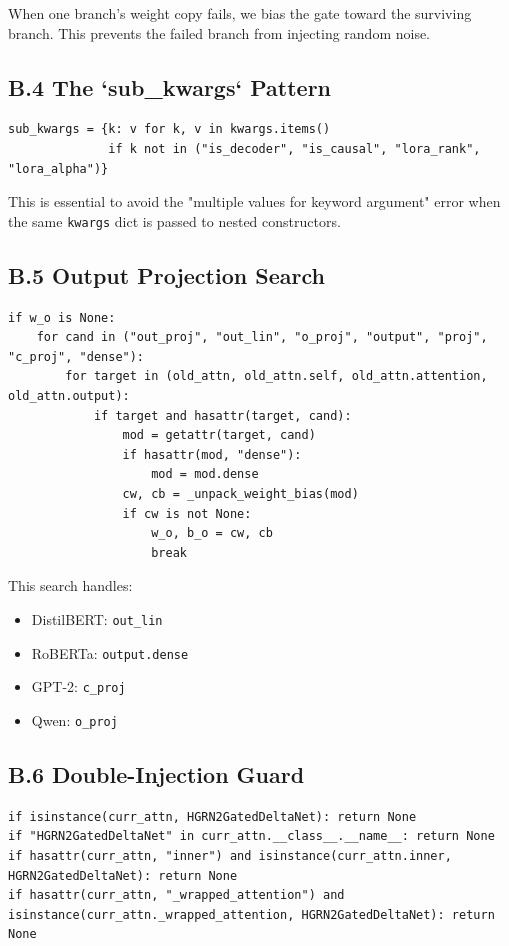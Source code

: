 When one branch's weight copy fails, we bias the gate toward the surviving 
branch. This prevents the failed branch from injecting random noise.

\subsection{B.4 The `sub\_kwargs` Pattern}

\begin{lstlisting}
sub_kwargs = {k: v for k, v in kwargs.items() 
              if k not in ("is_decoder", "is_causal", "lora_rank", "lora_alpha")}
\end{lstlisting}

This is essential to avoid the "multiple values for keyword argument" error 
when the same \texttt{kwargs} dict is passed to nested constructors.

\subsection{B.5 Output Projection Search}

\begin{lstlisting}
if w_o is None:
    for cand in ("out_proj", "out_lin", "o_proj", "output", "proj", "c_proj", "dense"):
        for target in (old_attn, old_attn.self, old_attn.attention, old_attn.output):
            if target and hasattr(target, cand):
                mod = getattr(target, cand)
                if hasattr(mod, "dense"):
                    mod = mod.dense
                cw, cb = _unpack_weight_bias(mod)
                if cw is not None:
                    w_o, b_o = cw, cb
                    break
\end{lstlisting}

This search handles:
\begin{itemize}
\item DistilBERT: \texttt{out\_lin}
\item RoBERTa: \texttt{output.dense}
\item GPT-2: \texttt{c\_proj}
\item Qwen: \texttt{o\_proj}

\end{itemize}
\subsection{B.6 Double-Injection Guard}

\begin{lstlisting}
if isinstance(curr_attn, HGRN2GatedDeltaNet): return None
if "HGRN2GatedDeltaNet" in curr_attn.__class__.__name__: return None
if hasattr(curr_attn, "inner") and isinstance(curr_attn.inner, HGRN2GatedDeltaNet): return None
if hasattr(curr_attn, "_wrapped_attention") and isinstance(curr_attn._wrapped_attention, HGRN2GatedDeltaNet): return None
\end{lstlisting}

